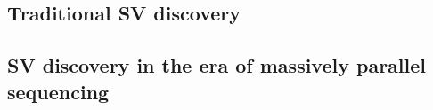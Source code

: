 \subsection{Traditional SV discovery}
\label{sec:sv_detection_old}


\subsection{SV discovery in the era of massively parallel sequencing}
\label{sec:sv_detection_ngs}
